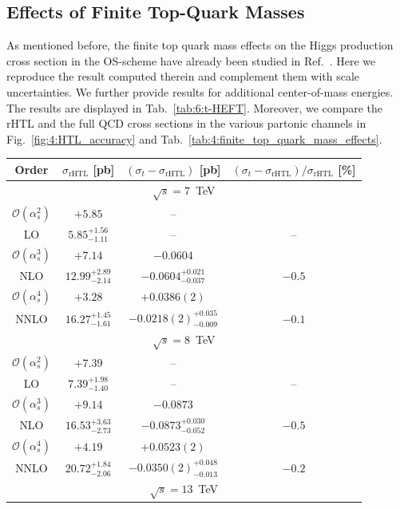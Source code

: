 \subsection{Effects of Finite Top-Quark Masses}
As mentioned before, the finite top quark mass effects on the Higgs production cross section in the \acs{OS}-scheme have already been studied in Ref.~\cite{Czakon:2021yub}. Here we reproduce the result computed therein and complement them with scale uncertainties. We further provide results for additional center-of-mass energies. The results are displayed in Tab.~\ref{tab:6:t-HEFT}. Moreover, we compare the \acs{rHTL} and the full \acs{QCD} cross sections in the various partonic channels in Fig.~\ref{fig:4:HTL_accuracy} and Tab.~\ref{tab:4:finite_top_quark_mass_effects}.
\begin{table}[t]
\centering
\begin{tabular}{cccc}
Order  &  $\sigma_\text{rHTL}$ [pb] & $(\sigma_t - \sigma_\text{rHTL})$ [pb]  &  $(\sigma_t - \sigma_\text{rHTL})/\sigma_\text{rHTL}$ [\%]  \\
\hline
\hline
\multicolumn{4}{c}{$\sqrt{s}=7$~TeV}\\
\hline
$\mathcal{O}(\alpha_s^2)$ & $+5.85$ & -- &  \\
LO & $5.85^{+1.56}_{-1.11}$ & -- & --  \\
\hline
$\mathcal{O}(\alpha_s^3)$ & $+7.14$ & $-0.0604$ &  \\
NLO & $12.99^{+2.89}_{-2.14}$ & $-0.0604^{+0.021}_{-0.037}$ & $-0.5$  \\
\hline
$\mathcal{O}(\alpha_s^4)$ & $+3.28$ & $+0.0386(2)$ &  \\
NNLO & $16.27^{+1.45}_{-1.61}$ & $-0.0218(2)^{+0.035}_{-0.009}$ & $-0.1$  \\
\hline
\hline
\multicolumn{4}{c}{$\sqrt{s}=8$~TeV}\\
\hline
$\mathcal{O}(\alpha_s^2)$ & $+7.39$ & -- &  \\
LO & $7.39^{+1.98}_{-1.40}$ & -- & --  \\
\hline
$\mathcal{O}(\alpha_s^3)$ & $+9.14$ & $-0.0873$ &  \\
NLO & $16.53^{+3.63}_{-2.73}$ & $-0.0873^{+0.030}_{-0.052}$ & $-0.5$  \\
\hline
$\mathcal{O}(\alpha_s^4)$ & $+4.19$ & $+0.0523(2)$ &   \\
NNLO & $20.72^{+1.84}_{-2.06}$ & $-0.0350(2)^{+0.048}_{-0.013}$ & $-0.2$  \\
\hline
\hline
\multicolumn{4}{c}{$\sqrt{s}=13$~TeV}\\

\end{tabular}
\end{table}
